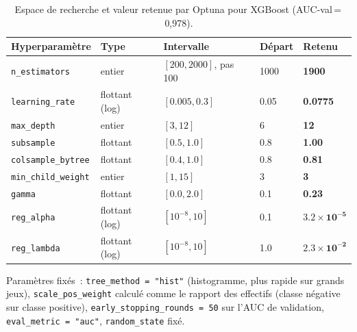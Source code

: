 \label{ann:hyp-xgb}

\begin{table}[H]
    \centering
    \small
    \caption{Espace de recherche et valeur retenue par Optuna pour XGBoost (AUC-val\,=\,0,978).}
    \label{tab:hyp-xgb}
    \begin{tabular}{lllll}
        \hline
        Hyperparam\`etre & Type & Intervalle & D\'epart & \textbf{Retenu} \\
        \hline
        \texttt{n\_estimators}      & entier        & $[200, 2000]$, pas 100 & 1000  & \textbf{1900}                  \\
        \texttt{learning\_rate}     & flottant (log) & $[0.005, 0.3]$        & 0.05  & \textbf{0.0775}                \\
        \texttt{max\_depth}         & entier        & $[3, 12]$              & 6     & \textbf{12}                    \\
        \texttt{subsample}          & flottant      & $[0.5, 1.0]$           & 0.8   & \textbf{1.00}                  \\
        \texttt{colsample\_bytree}  & flottant      & $[0.4, 1.0]$           & 0.8   & \textbf{0.81}                  \\
        \texttt{min\_child\_weight} & entier        & $[1, 15]$              & 3     & \textbf{3}                     \\
        \texttt{gamma}              & flottant      & $[0.0, 2.0]$           & 0.1   & \textbf{0.23}                  \\
        \texttt{reg\_alpha}         & flottant (log) & $[10^{-8}, 10]$       & 0.1   & $\mathbf{3.2 \times 10^{-5}}$  \\
        \texttt{reg\_lambda}        & flottant (log) & $[10^{-8}, 10]$       & 1.0   & $\mathbf{2.3 \times 10^{-2}}$  \\
        \hline
    \end{tabular}
\end{table}

Param\`etres fix\'es~: \texttt{tree\_method = "hist"} (histogramme, plus rapide sur grands jeux), \texttt{scale\_pos\_weight} calcul\'e comme le rapport des effectifs (classe n\'egative sur classe positive), \texttt{early\_stopping\_rounds = 50} sur l'AUC de validation, \texttt{eval\_metric = "auc"}, \texttt{random\_state} fix\'e.


